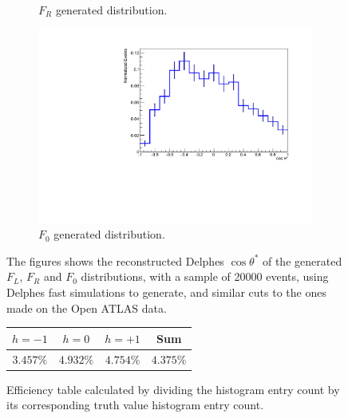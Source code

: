 \documentclass[12pt,a4paper]{article}
\numberwithin{equation}{section}
\begin{document}
\begin{figure}[t!]
\begin{subfigure}[t]{0.5\textwidth}
    \caption{$F_R$ generated distribution.}
  \end{subfigure}
  \begin{subfigure}[t]{0.5\textwidth}
    \centering
    \includegraphics[width=1.0\textwidth]{figures/delphes_ctstar0}
    \caption{$F_0$ generated distribution.}
  \end{subfigure}
  \caption{The figures shows the reconstructed Delphes $\cos \theta^*$ of the
    generated $F_L$, $F_R$ and $F_0$ distributions, with a sample of 20000
    events, using Delphes fast simulations to generate, and similar cuts to
    the ones made on the Open ATLAS data.}\label{fig:redelphesdist}
\end{figure}

\begin{figure}[ht]
  \centering
  \begin{tabular}[H]{|c|c|c|c|}
    \hline
    $h=-1$    & $h=0$     & $h=+1$    & Sum       \\\hline
    $3.457\%$ & $4.932\%$ & $4.754\%$ & $4.375\%$ \\\hline
  \end{tabular}
  \caption{\label{fig:delphesefficiency}Efficiency table calculated by dividing
    the histogram entry count by its corresponding truth value histogram entry
    count.}
\end{figure}
\end{document}
